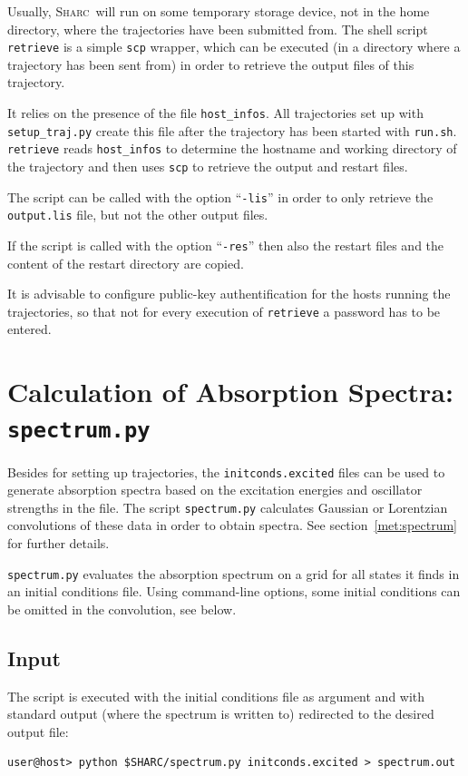 \documentclass[a4paper,11pt,DIV=15,openany,twoside=false]{scrbook}
\newcommand{\sharc}{\textsc{Sharc}}
\newcommand{\ttt}[1]{\texttt{#1}}
\begin{document}
Usually, \sharc\ will run on some temporary storage device, not in the home directory, where the trajectories have been submitted from. The shell script \ttt{retrieve} is a simple \ttt{scp} wrapper, which can be executed (in a directory where a trajectory has been sent from) in order to retrieve the output files of this trajectory.

It relies on the presence of the file \ttt{host\_infos}. All trajectories set up with \ttt{setup\_traj.py} create this file after the trajectory has been started with \ttt{run.sh}. \ttt{retrieve} reads \ttt{host\_infos} to determine the hostname and working directory of the trajectory and then uses \ttt{scp} to retrieve the output and restart files.

The script can be called with the option ``\ttt{-lis}'' in order to only retrieve the \ttt{output.lis} file, but not the other output files.

If the script is called with the option ``\ttt{-res}'' then also the restart files and the content of the restart directory are copied.

It is advisable to configure public-key authentification for the hosts running the trajectories, so that not for every execution of \ttt{retrieve} a password has to be entered.



\section{Calculation of Absorption Spectra: \ttt{spectrum.py}}\label{sec:spectrum.py}

Besides for setting up trajectories, the \ttt{initconds.excited} files can be used to generate absorption spectra based on the excitation energies and oscillator strengths in the file. The script \ttt{spectrum.py} calculates Gaussian or Lorentzian convolutions of these data in order to obtain spectra. See section~\ref{met:spectrum} for further details.

\ttt{spectrum.py} evaluates the absorption spectrum on a grid for all states it finds in an initial conditions file. Using command-line options, some initial conditions can be omitted in the convolution, see below.

\subsection{Input}

The script is executed with the initial conditions file as argument and with standard output (where the spectrum is written to) redirected to the desired output file:
\begin{verbatim}
user@host> python $SHARC/spectrum.py initconds.excited > spectrum.out
\end{verbatim}
\end{document}
